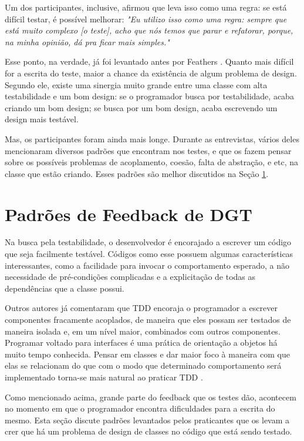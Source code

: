 Um dos participantes, inclusive, afirmou que leva isso como uma regra:
se está difícil testar, é possível melhorar:
\textit{"Eu utilizo isso como uma regra: sempre que está muito complexo [o teste],
acho que nós temos que parar e refatorar, porque, na minha opinião, dá
pra ficar mais simples."}

Esse ponto, na verdade, já foi levantado antes por Feathers \cite{feathers-synergy}.
Quanto mais difícil for a escrita do teste, maior a chance da existência de
algum problema de design. Segundo ele, 
existe uma sinergia muito grande entre uma classe com alta testabilidade e um bom design: 
se o programador busca por testabilidade, acaba criando um bom design; se 
busca por um bom design, acaba escrevendo um design mais
testável.

Mas, os participantes foram ainda mais longe. Durante as entrevistas,
vários deles mencionaram diversos padrões que encontram nos testes,
e que os fazem pensar sobre os possíveis problemas de acoplamento,
coesão, falta de abstração, e etc, na classe que estão criando.
Esses padrões são melhor discutidos na Seção \ref{padroes-tdd}.


\section{Padrões de Feedback de DGT}
\label{padroes-tdd}

Na busca pela testabilidade, o desenvolvedor é encorajado a escrever um
código que seja facilmente testável. Códigos como esse possuem algumas
características interessantes, como a facilidade para invocar o comportamento
esperado, a não necessidade de pré-condições complicadas e a explicitação de
todas as dependências que a classe possui.

Outros autores já comentaram que 
TDD encoraja o programador a escrever componentes fracamente acoplados, de
maneira que eles possam ser testados de maneira isolada e, em um nível maior,
combinados com outros componentes.
Programar voltado para interfaces é uma prática de orientação a objetos há muito
tempo conhecida. Pensar em classes e dar maior foco à maneira com que
elas se relacionam do que com o modo que determinado comportamento será implementado
torna-se mais natural ao praticar TDD \cite{GOOS}. 

Como mencionado acima, grande parte do feedback que os testes
dão, acontecem no momento em que o programador encontra dificuldades para a
escrita do mesmo. Esta seção discute padrões levantados pelos praticantes
que os levam a crer que há um problema de design de classes no código
que está sendo testado.

